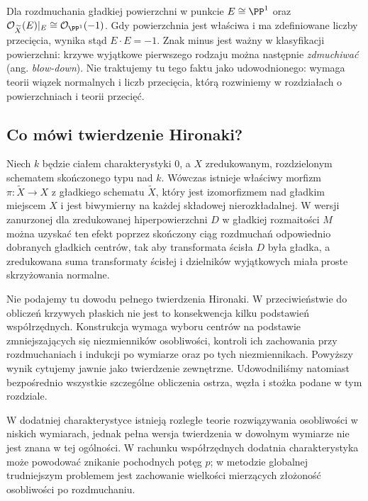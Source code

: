 \begin{uwaga}
Dla rozdmuchania gładkiej powierzchni w punkcie
$E\cong\PP^1$ oraz
$\mathcal O_{\widetilde X}(E)|_E\cong\mathcal O_{\PP^1}(-1)$.
Gdy powierzchnia jest właściwa i ma zdefiniowane
liczby przecięcia, wynika stąd $E\cdot E=-1$.
Znak minus jest ważny w klasyfikacji powierzchni:
krzywe wyjątkowe pierwszego rodzaju można następnie
\emph{zdmuchiwać} (ang. \emph{blow-down}).
Nie traktujemy tu tego faktu jako udowodnionego:
wymaga teorii wiązek normalnych i liczb przecięcia,
którą rozwiniemy w rozdziałach o powierzchniach
i teorii przecięć.
\end{uwaga}

\subsection{Co mówi twierdzenie Hironaki?}

\begin{twierdzenie}
\label{tw:ga5-hironaka}
Niech $k$ będzie ciałem charakterystyki $0$, a $X$
zredukowanym, rozdzielonym schematem skończonego typu nad $k$.
Wówczas istnieje właściwy morfizm
$\pi:\widetilde X\to X$ z gładkiego schematu
$\widetilde X$, który jest izomorfizmem nad gładkim
miejscem $X$ i jest biwymierny na każdej składowej
nierozkładalnej. W wersji zanurzonej dla zredukowanej
hiperpowierzchni $D$ w gładkiej rozmaitości $M$
można uzyskać ten efekt poprzez skończony ciąg
rozdmuchań odpowiednio dobranych gładkich centrów,
tak aby transformata ścisła $D$ była gładka, a
zredukowana suma transformaty ścisłej i dzielników
wyjątkowych miała proste skrzyżowania normalne.
\end{twierdzenie}

\begin{uwaga}
Nie podajemy tu dowodu pełnego twierdzenia Hironaki.
W przeciwieństwie do obliczeń krzywych płaskich nie jest
to konsekwencja kilku podstawień współrzędnych.
Konstrukcja wymaga wyboru centrów na podstawie
zmniejszających się niezmienników osobliwości,
kontroli ich zachowania przy rozdmuchaniach
i indukcji po wymiarze oraz po tych niezmiennikach.
Powyższy wynik cytujemy jawnie jako twierdzenie
zewnętrzne. Udowodniliśmy natomiast bezpośrednio
wszystkie szczególne obliczenia ostrza, węzła
i stożka podane w tym rozdziale.
\end{uwaga}

\begin{uwaga}
W dodatniej charakterystyce istnieją rozległe
teorie rozwiązywania osobliwości w niskich wymiarach,
jednak pełna wersja twierdzenia w dowolnym wymiarze
nie jest znana w tej ogólności. W rachunku
współrzędnych dodatnia charakterystyka może powodować
znikanie pochodnych potęg $p$; w metodzie globalnej
trudniejszym problemem jest zachowanie wielkości
mierzących złożoność osobliwości po rozdmuchaniu.
\end{uwaga}


